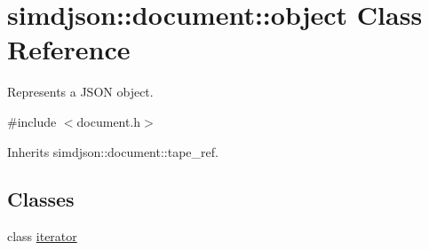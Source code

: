 \hypertarget{classsimdjson_1_1document_1_1object}{}\section{simdjson\+:\+:document\+:\+:object Class Reference}
\label{classsimdjson_1_1document_1_1object}


Represents a J\+S\+ON object.  




{\ttfamily \#include $<$document.\+h$>$}



Inherits simdjson\+::document\+::tape\+\_\+ref.

\subsection*{Classes}
\begin{DoxyCompactItemize}
\item 
class \hyperlink{classsimdjson_1_1document_1_1object_1_1iterator}{iterator}
\end{DoxyCompactItemize}
